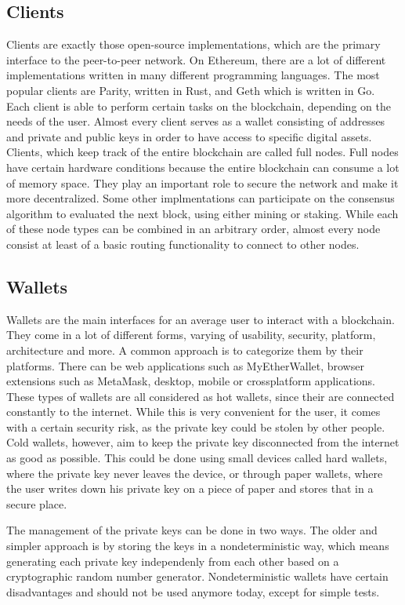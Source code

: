 \subsection{Clients}
Clients are exactly those open-source implementations, which are the primary interface to the peer-to-peer network. On Ethereum, there are a lot of different
implementations written in many different programming languages. The most popular clients are Parity, written in Rust, and Geth which is written in Go. Each client
is able to perform certain tasks on the blockchain, depending on the needs of the user. Almost every client serves as a wallet consisting of addresses and private and
public keys in order to have access to specific digital assets. Clients, which keep track of the entire blockchain are called full nodes. Full nodes have certain
hardware conditions because the entire blockchain can consume a lot of memory space. They play an important role to secure the network and make it more decentralized.
Some other implmentations can participate on the consensus algorithm to evaluated the next block, using either mining or staking. While each of these node types
can be combined in an arbitrary order, almost every node consist at least of a basic routing functionality to connect to other nodes.

\subsection{Wallets}
Wallets are the main interfaces for an average user to interact with a blockchain. They come in a lot of different forms, varying of usability, security, platform,
architecture and more. A common approach is to categorize them by their platforms. There can be web applications such as MyEtherWallet, browser extensions such as
MetaMask, desktop, mobile or crossplatform applications. These types of wallets are all considered as hot wallets, since their are connected constantly to the
internet. While this is very convenient for the user, it comes with a certain security risk, as the private key could be stolen by other people. Cold wallets,
however, aim to keep the private key disconnected from the internet as good as possible. This could be done using small devices called hard wallets, where the private
key never leaves the device, or through paper wallets, where the user writes down his private key on a piece of paper and stores that in a secure place.

The management of the private keys can be done in two ways. The older and simpler approach is by storing the keys in a nondeterministic way, which means generating
each private key independenly from each other based on a cryptographic random number generator. Nondeterministic wallets have certain disadvantages and should not be
used anymore today, except for simple tests.

